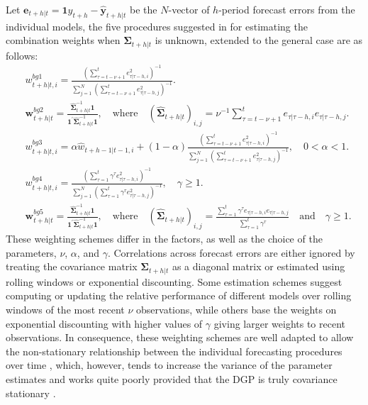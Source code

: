 \documentclass[11pt]{article}
\begin{document}
Let $\mathbf{e}_{t+h|t}=\mathbf{1} y_{t+h}-\hat{\mathbf{y}}_{t+h|t}$ be the $N$-vector of $h$-period forecast errors from the individual models, the five procedures suggested in \cite{Bates1969-yj} for estimating the combination weights when $\boldsymbol{\Sigma}_{t+h|t}$ is unknown, extended to the general case are as follows:
\begin{align}
&w_{t+h|t, i}^{bg1}=\frac{\left( \sum_{\tau=t-\nu+1}^{t} e_{\tau|\tau-h, i}^{2} \right)^{-1}}{\sum_{j=1}^{N}\left(\sum_{\tau=t-\nu+1}^{t} e_{\tau|\tau-h, j}^{2}\right)^{-1}}. \label{eq:weight_bg1}\\
&\boldsymbol{w}_{t+h|t}^{bg2}=\frac{\hat{\boldsymbol{\Sigma}}_{t+h|t}^{-1}\mathbf{1}}{\mathbf{1}^{\prime} \hat{\boldsymbol{\Sigma}}_{t+h|t}^{-1} \mathbf{1}}, \quad \text{where} \quad (\hat{\boldsymbol{\Sigma}}_{t+h|t})_{i, j}=\nu^{-1} \sum_{\tau=t-\nu+1}^{t} e_{\tau|\tau-h, i} e_{\tau|\tau-h, j}. \label{eq:weight_bg2}\\
&w_{t+h|t, i}^{bg3}=\alpha \hat{w}_{t+h-1|t-1, i} + (1-\alpha) \frac{\left( \sum_{\tau=t-\nu+1}^{t} e_{\tau|\tau-h, i}^{2} \right)^{-1}}{\sum_{j=1}^{N}\left(\sum_{\tau=t-\nu+1}^{t} e_{\tau|\tau-h, j}^{2}\right)^{-1}}, \quad 0<\alpha<1. \label{eq:weight_bg3}\\
&w_{t+h|t, i}^{bg4}=\frac{\left( \sum_{\tau=1}^{t} \gamma^{\tau} e_{\tau|\tau-h, i}^{2} \right)^{-1}}{\sum_{j=1}^{N}\left(\sum_{\tau=1}^{t} \gamma^{\tau} e_{\tau|\tau-h, j}^{2}\right)^{-1}}, \quad \gamma \geq 1. \label{eq:weight_bg4}\\
&\boldsymbol{w}_{t+h|t}^{bg5}=\frac{\hat{\boldsymbol{\Sigma}}_{t+h|t}^{-1}\mathbf{1}}{\mathbf{1}^{\prime} \hat{\boldsymbol{\Sigma}}_{t+h|t}^{-1} \mathbf{1}}, \quad \text{where} \quad (\hat{\boldsymbol{\Sigma}}_{t+h|t})_{i, j}=\frac{\sum_{\tau=1}^{t} \gamma^{\tau} e_{\tau|\tau-h, i} e_{\tau|\tau-h, j}}{\sum_{\tau=1}^{t} \gamma^{\tau}} \quad \text{and} \quad \gamma \geq 1. \label{eq:weight_bg5}
\end{align}
These weighting schemes differ in the factors, as well as the choice of the parameters, $\nu$, $\alpha$, and $\gamma$. Correlations across forecast errors are either ignored by treating the covariance matrix $\boldsymbol{\Sigma}_{t+h|t}$ as a diagonal matrix or estimated using rolling windows or exponential discounting. Some estimation schemes suggest computing or updating the relative performance of different models over rolling windows of the most recent $\nu$ observations, while others base the weights on exponential discounting with higher values of $\gamma$ giving larger weights to recent observations. In consequence, these weighting schemes are well adapted to allow the non-stationary relationship between the individual forecasting procedures over time \citep{Newbold1974-lp}, which, however, tends to increase the variance of the parameter estimates and works quite poorly provided that the DGP is truly covariance stationary \citep{Timmermann2006-en}.
\end{document}
